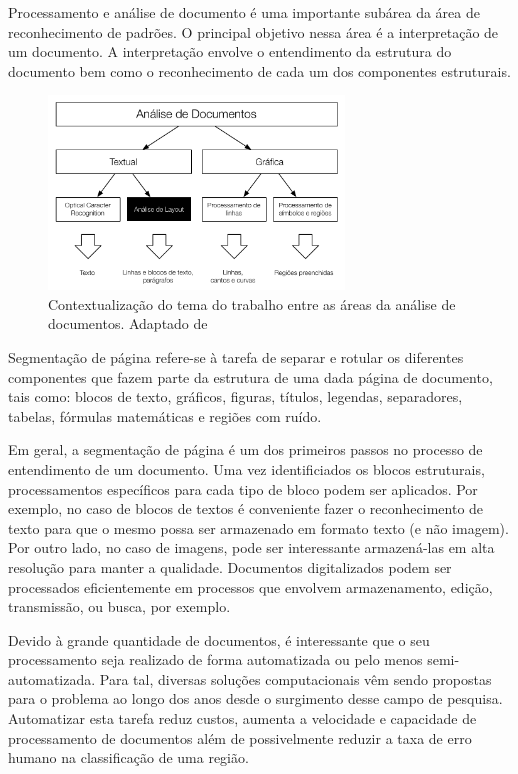 \documentclass[a4paper,11pt]{article}
\begin{document}
Processamento e análise de documento é uma importante subárea da área
de reconhecimento de padrões. O principal objetivo nessa área é a
interpretação de um documento. A interpretação envolve o entendimento
da estrutura do documento bem como o reconhecimento de cada um dos
componentes estruturais.

\begin{figure}[htb]
\begin{center}
\includegraphics[width=0.7\textwidth]{assets/document_processing_areas_hierarquies.pdf}
\end{center}
\caption{Contextualização do tema do trabalho entre as áreas da
  análise de documentos. Adaptado de~\cite{Kasturi_OGorman_Govindaraju_2002}}
\label{fig:context1}
\end{figure}

Segmentação de página refere-se à tarefa de separar e rotular os diferentes
componentes que fazem parte da estrutura de uma dada página de
documento, tais como: blocos de texto, gráficos, figuras, títulos,
legendas, separadores, tabelas, fórmulas matemáticas e regiões com
ruído.

Em geral, a segmentação de página é um dos primeiros passos no
processo de entendimento de um documento. Uma vez identificiados os
blocos estruturais, processamentos específicos para cada tipo de bloco
podem ser aplicados. Por exemplo, no caso de blocos de textos é
conveniente fazer o reconhecimento de texto para que o mesmo possa ser
armazenado em formato texto (e não imagem). Por outro lado, no caso de
imagens, pode ser interessante armazená-las em alta resolução para
manter a qualidade. Documentos digitalizados podem ser processados
eficientemente em processos que envolvem armazenamento, edição,
transmissão, ou busca, por exemplo.

Devido à grande quantidade de documentos, é interessante que o seu
processamento seja realizado de forma automatizada ou pelo menos
semi-automatizada. Para tal, diversas soluções computacionais vêm
sendo propostas para o problema ao longo dos anos desde o surgimento
desse campo de pesquisa. Automatizar esta tarefa reduz custos, aumenta
a velocidade e capacidade de processamento de documentos além de
possivelmente reduzir a taxa de erro humano na classificação de uma
região.
\end{document}
